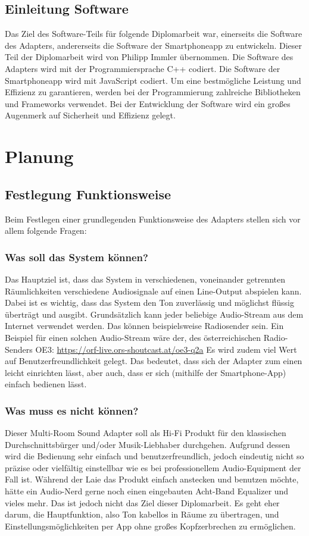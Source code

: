 \documentclass[]{article}
\begin{document}
\subsection{Einleitung Software}
Das Ziel des Software-Teils für folgende Diplomarbeit war, einerseits die Software des Adapters, andererseits die Software der Smartphoneapp zu entwickeln. Dieser Teil der Diplomarbeit wird von Philipp Immler übernommen. Die Software des Adapters wird mit der Programmiersprache C++ codiert. Die Software der Smartphoneapp wird mit JavaScript codiert. Um eine bestmögliche Leistung und Effizienz zu garantieren, werden bei der Programmierung zahlreiche Bibliotheken und Frameworks verwendet. Bei der Entwicklung der Software wird ein großes Augenmerk auf Sicherheit und Effizienz gelegt. 

\section{Planung}
\subsection{Festlegung Funktionsweise}
Beim Festlegen einer grundlegenden Funktionsweise des Adapters stellen sich vor allem folgende Fragen:
\subsubsection{Was soll das System können?}
Das Hauptziel ist, dass das System in verschiedenen, voneinander getrennten Räumlichkeiten verschiedene Audiosignale auf einen Line-Output abspielen kann. Dabei ist es wichtig, dass das System den Ton zuverlässig und möglichst flüssig überträgt und ausgibt. \newline 
Grundsätzlich kann jeder beliebige Audio-Stream aus dem Internet verwendet werden. Das können beispielsweise Radiosender sein.
Ein Beispiel für einen solchen Audio-Stream wäre der, des österreichischen Radio-Senders \glqq OE3\grqq{}: \newline
\url{https://orf-live.ors-shoutcast.at/oe3-q2a}
\vspace{4mm} \newline
Es wird zudem viel Wert auf Benutzerfreundlichkeit gelegt. Das bedeutet, dass sich der Adapter zum einen leicht einrichten lässt, aber auch, dass er sich (mithilfe der Smartphone-App) einfach bedienen lässt.
\subsubsection{Was muss es nicht können?}
Dieser Multi-Room Sound Adapter soll als Hi-Fi Produkt für den klassischen Durchschnittsbürger und/oder Musik-Liebhaber durchgehen. Aufgrund dessen wird die Bedienung sehr einfach und benutzerfreundlich, jedoch eindeutig nicht so präzise oder vielfältig einstellbar wie es bei professionellem Audio-Equipment der Fall ist. Während der Laie das Produkt einfach anstecken und benutzen möchte, hätte ein Audio-Nerd gerne noch einen eingebauten Acht-Band Equalizer und vieles mehr. Das ist jedoch nicht das Ziel dieser Diplomarbeit. Es geht eher darum, die Hauptfunktion, also Ton kabellos in Räume zu übertragen, und Einstellungsmöglichkeiten per App ohne großes Kopfzerbrechen zu ermöglichen.
\end{document}
